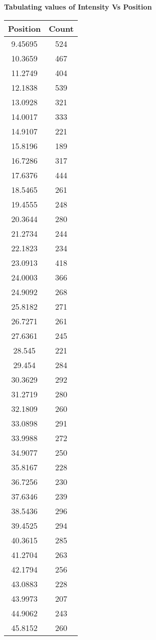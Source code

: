\documentclass[10pt,a4paper]{article}
\begin{document}
\begin{table}[H]
\textbf{Tabulating values of Intensity Vs Position}\par\medskip
\begin{tabular}{|c|c|}
\hline
Position & Count \\ 
	\hline
9.45695 & 524 \\
10.3659 & 467 \\
11.2749 & 404 \\
12.1838 & 539 \\
13.0928 & 321 \\
14.0017 & 333 \\
14.9107 & 221 \\
15.8196 & 189 \\
16.7286 & 317 \\
17.6376 & 444 \\
18.5465 & 261 \\
19.4555 & 248 \\
20.3644 & 280 \\
21.2734 & 244 \\
22.1823 & 234 \\
23.0913 & 418 \\
24.0003 & 366 \\
24.9092 & 268 \\
25.8182 & 271 \\
26.7271 & 261 \\
27.6361 & 245 \\
28.545 & 221 \\
29.454 & 284 \\
30.3629 & 292 \\
31.2719 & 280 \\
32.1809 & 260 \\
33.0898 & 291 \\
33.9988 & 272 \\
34.9077 & 250 \\
35.8167 & 228 \\
36.7256 & 230 \\
37.6346 & 239 \\
38.5436 & 296 \\
39.4525 & 294 \\
40.3615 & 285 \\
41.2704 & 263 \\
42.1794 & 256 \\
43.0883 & 228 \\
43.9973 & 207 \\
44.9062 & 243 \\
45.8152 & 260 \\

\end{tabular}
\end{table}
\end{document}
